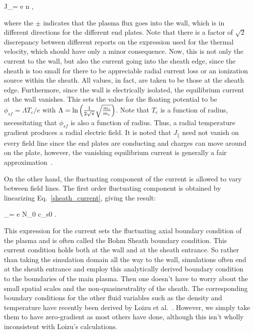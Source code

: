 \beq
\label{sheath_current}
J_\parallel = \pm e n ,
\eeq

where the $\pm$ indicates that the plasma flux goes into the wall, which is in different directions for the different end plates.
Note that there is a factor of $\sqrt{2}$ discrepancy between different reports on the expression used for the thermal velocity, which should have only a minor consequence.
Now, this is not only the current to the wall, but also the current going into the sheath edge, since the sheath is too small for there to be appreciable radial current loss or an ionization source
within the sheath. All values, in fact, are taken to be those at the sheath edge.
Furthermore, since the wall is electrically isolated, the equilibrium current at the wall vanishes.
This sets the value for the floating potential to be $\phi_{sf} = \Lambda T_e / e$ with $\Lambda = {\rm ln} \left(\frac{1}{2 \sqrt{\pi}} \sqrt{\frac{m_i}{m_e}} \right)$.
Note that $T_e$ is a function of radius, necessitating that $\phi_{sf}$ is also a function of radius. Thus, a radial temperature gradient produces a radial
electric field. It is noted that $J_\parallel$ need not vanish on every field line since the end plates are conducting and charges can move around on the plate, 
however, the vanishing equilibrium current is generally a fair approximation~\cite{berk1993}.

On the other hand, the fluctuating component of the current is allowed to vary between field lines.
The first order fluctuating component is obtained by linearizing Eq.~\ref{sheath_current}, giving the result:

\beq
\label{lin_sheath_current}
_\parallel = \pm e N_0 c_{s0} .
\eeq

This expression for the current sets the fluctuating axial boundary condition of the plasma and is often called the Bohm Sheath boundary condition. This current condition holds both at
the wall and at the sheath entrance. So rather than taking the simulation
domain all the way to the wall, simulations often end at the sheath entrance and employ this analytically derived boundary condition to the boundaries of the main plasma. 
Then one doesn't have to worry about the small spatial scales and the non-quasineutrality of the sheath.
The corresponding boundary conditions for the other fluid variables such as the density and temperature have recently been derived by Loizu et al.~\cite{loizu2012}. However, we
simply take them to have zero-gradient as most others have done, although this isn't wholly inconsistent with Loizu's calculations.

